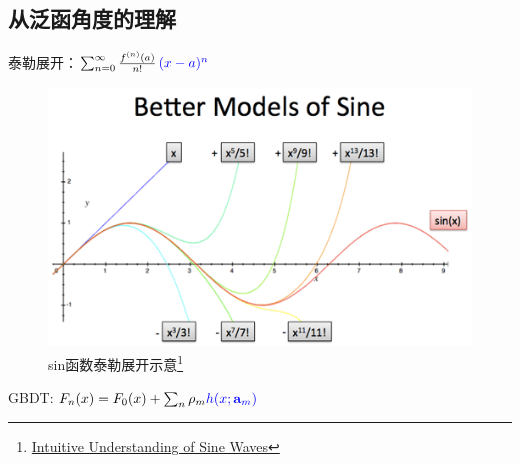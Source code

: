 \subsection{从泛函角度的理解}

%

\begin{frame}
    \begin{figure}
        \centering
        \resizebox{1.1\onepicwidth}{!}{}
    \end{figure}
\end{frame}

\begin{frame}
    泰勒展开：$\sum _{n=0}^{\infty }{\frac{f^{(n)}(a)}{n!}}\,\textcolor{blue}{(x-a)^{n}}$

    \begin{figure}[!tb]
        \includegraphics[width=\twopicwidth]{figure/gbdt/sine-better-models}
        \caption{sin函数泰勒展开示意\footnote{
                 \href{https://betterexplained.com/articles/intuitive-understanding-of-sine-waves/}{Intuitive Understanding of Sine Waves}}}
    \end{figure}

    GBDT: $F_n(x) = F_{0}(x) + \sum_n \rho_m \textcolor{blue}{h(x; \mathbf{a}_m)}$
\end{frame}


